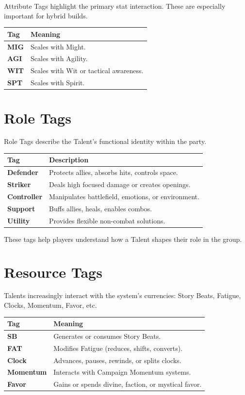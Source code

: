 \documentclass[11pt]{book}
\begin{document}
Attribute Tags highlight the primary stat interaction.
These are especially important for hybrid builds.

\begin{longtable}{|p{3cm}|p{9cm}|}
\hline
\textbf{Tag} & \textbf{Meaning} \\ \hline
\textbf{MIG} & Scales with Might. \\ \hline
\textbf{AGI} & Scales with Agility. \\ \hline
\textbf{WIT} & Scales with Wit or tactical awareness. \\ \hline
\textbf{SPT} & Scales with Spirit. \\ \hline
\end{longtable}

\section{Role Tags}

Role Tags describe the Talent's functional identity within the party.

\begin{longtable}{|p{3cm}|p{9cm}|}
\hline
\textbf{Tag} & \textbf{Description} \\ \hline
\textbf{Defender} & Protects allies, absorbs hits, controls space. \\ \hline
\textbf{Striker} & Deals high focused damage or creates openings. \\ \hline
\textbf{Controller} & Manipulates battlefield, emotions, or environment. \\ \hline
\textbf{Support} & Buffs allies, heals, enables combos. \\ \hline
\textbf{Utility} & Provides flexible non-combat solutions. \\ \hline
\end{longtable}

These tags help players understand how a Talent shapes their role in the group.

\section{Resource Tags}

Talents increasingly interact with the system's currencies:
Story Beats, Fatigue, Clocks, Momentum, Favor, etc.

\begin{longtable}{|p{3cm}|p{9cm}|}
\hline
\textbf{Tag} & \textbf{Meaning} \\ \hline
\textbf{SB} & Generates or consumes Story Beats. \\ \hline
\textbf{FAT} & Modifies Fatigue (reduces, shifts, converts). \\ \hline
\textbf{Clock} & Advances, pauses, rewinds, or splits clocks. \\ \hline
\textbf{Momentum} & Interacts with Campaign Momentum systems. \\ \hline
\textbf{Favor} & Gains or spends divine, faction, or mystical favor. \\ \hline
\end{longtable}
\end{document}
